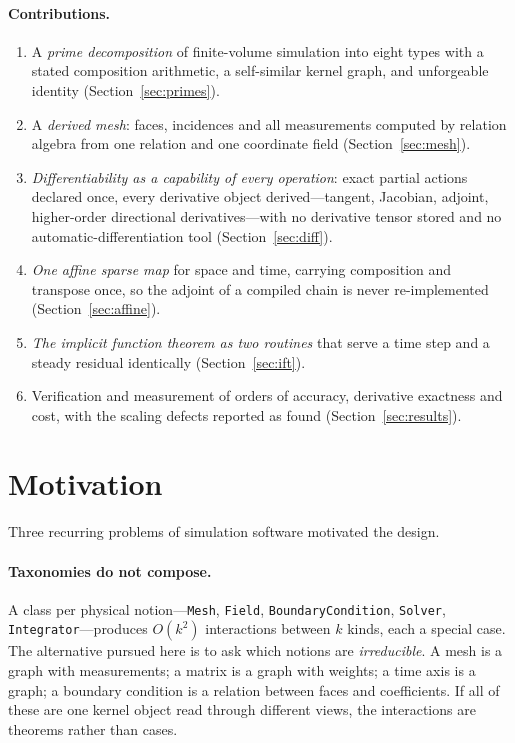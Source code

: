 \documentclass[11pt,a4paper]{article}
\newcommand{\code}[1]{\texttt{#1}}
\begin{document}
\paragraph{Contributions.}
\begin{enumerate}[nosep]
\item A \emph{prime decomposition} of finite-volume simulation into eight types with a stated composition arithmetic, a self-similar kernel graph, and unforgeable identity (Section~\ref{sec:primes}).
\item A \emph{derived mesh}: faces, incidences and all measurements computed by relation algebra from one relation and one coordinate field (Section~\ref{sec:mesh}).
\item \emph{Differentiability as a capability of every operation}: exact partial actions declared once, every derivative object derived---tangent, Jacobian, adjoint, higher-order directional derivatives---with no derivative tensor stored and no automatic-differentiation tool (Section~\ref{sec:diff}).
\item \emph{One affine sparse map} for space and time, carrying composition and transpose once, so the adjoint of a compiled chain is never re-implemented (Section~\ref{sec:affine}).
\item \emph{The implicit function theorem as two routines} that serve a time step and a steady residual identically (Section~\ref{sec:ift}).
\item Verification and measurement of orders of accuracy, derivative exactness and cost, with the scaling defects reported as found (Section~\ref{sec:results}).
\end{enumerate}

\section{Motivation}\label{sec:motivation}

Three recurring problems of simulation software motivated the design.

\paragraph{Taxonomies do not compose.} A class per physical notion---\code{Mesh}, \code{Field}, \code{BoundaryCondition}, \code{Solver}, \code{Integrator}---produces $O(k^2)$ interactions between $k$ kinds, each a special case. The alternative pursued here is to ask which notions are \emph{irreducible}. A mesh is a graph with measurements; a matrix is a graph with weights; a time axis is a graph; a boundary condition is a relation between faces and coefficients. If all of these are one kernel object read through different views, the interactions are theorems rather than cases.
\end{document}
